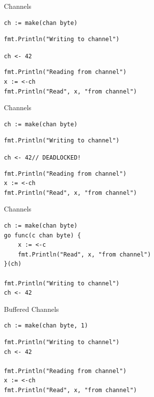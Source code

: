 \documentclass[pdf]{beamer}
\newcommand\z[1]{\texttt{#1}}
\newcommand\identifier[1]{{\color{green!70!black}\z{#1}}}
\begin{document}
\begin{frame}[fragile]{Channels}
\begin{lstlisting}
ch := make(chan byte)
\end{lstlisting}
\pause
\begin{lstlisting}
fmt.Println("Writing to channel")
\end{lstlisting}
\identifier{ch}\z{ <- 42}
\pause
\begin{lstlisting}
fmt.Println("Reading from channel")
x := <-ch
fmt.Println("Read", x, "from channel")
\end{lstlisting}
\end{frame}

\begin{frame}[fragile]{Channels}
\begin{lstlisting}
ch := make(chan byte)
\end{lstlisting}
\begin{lstlisting}
fmt.Println("Writing to channel")
\end{lstlisting}
{\color{red}\z{ch <- 42\qquad\qquad// DEADLOCKED!}}
\begin{lstlisting}
fmt.Println("Reading from channel")
x := <-ch
fmt.Println("Read", x, "from channel")
\end{lstlisting}
\end{frame}

\begin{frame}[fragile]{Channels}
\begin{lstlisting}
ch := make(chan byte)
go func(c chan byte) {
    x := <-c
    fmt.Println("Read", x, "from channel")
}(ch)

fmt.Println("Writing to channel")
ch <- 42
\end{lstlisting}
\end{frame}

\begin{frame}[fragile]{Buffered Channels}
\begin{lstlisting}
ch := make(chan byte, 1)
\end{lstlisting}
\pause
\begin{lstlisting}
fmt.Println("Writing to channel")
ch <- 42

fmt.Println("Reading from channel")
x := <-ch
fmt.Println("Read", x, "from channel")
\end{lstlisting}
\end{frame}
\end{document}
